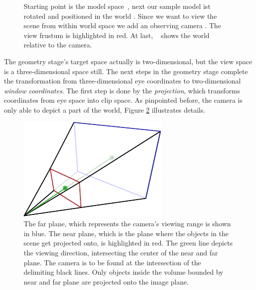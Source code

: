 \begin{figure}[t]
{  \label{fig:subfigviewspace}
}
\caption[Model, World and View space]{Starting point is the model
space~, next our sample model ist rotated and
positioned in the world . Since we want to view the
scene from within world space we add an observing camera
. The view frustum is highlighted in
red. At last, ~ shows the world relative to the
camera.}
\label{fig:ModelWorldView}
\end{figure}

The geometry stage's target space actually is two-dimensional, but the view
space is a three-dimensional space still. The next steps in the geometry stage
complete the transformation from three-dimensional eye coordinates to
two-dimensional \textit{window coordinates}. The first step is done by the
\textit{projection}, which transforms coordinates from eye space into clip
space. As pinpointed before, the camera is only able to depict a part of the
world, Figure \ref{fig:ViewFrustum3D} illustrates details.

\begin{figure}[b]
\begin{center}
 \includegraphics[scale=1.0]{Images/Frustum.pdf}
 \caption{The far plane, which represents the camera's viewing range is shown
in blue. The near plane, which is the plane where the objects in the scene get
projected onto, is highlighted in red. The green line depicts the viewing
direction, intersecting the center of the near and far plane. The camera is to
be found at the intersection of the delimiting black lines. Only objects inside
the volume bounded by near and far plane are projected onto the image plane.}
 \label{fig:ViewFrustum3D}
\end{center} 
\end{figure}

